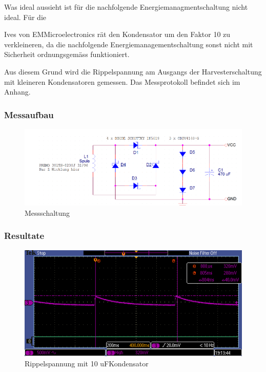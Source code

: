 Was ideal aussieht ist für die nachfolgende Energiemanagmentschaltung nicht ideal. Für die 



Ives von EMMicroelectronics rät den Kondensator um den Faktor 10 zu verkleineren, da die nachfolgende Energiemanagementschaltung sonst nicht mit Sicherheit ordnungsgemäss funktioniert. 

Aus diesem Grund wird die Rippelspannung am Ausgangs der Harvesterschaltung mit kleineren Kondensatoren gemessen. Das Messprotokoll befindet sich im Anhang.

\subsubsection*{Messaufbau}

\begin{figure}
\includegraphics[bb = 0 0 100 100]{3Vorgehen/imag/messschaltungHarvesterschaltung.gif}
\caption{Messschaltung}
\end{figure}

\subsubsection*{Resultate}

\begin{figure}
\includegraphics[bb = 0 0 100 100]{3Vorgehen/imag/10uF.PNG}
\caption{Rippelspannung mit 10 uFKondensator}
\end{figure}

